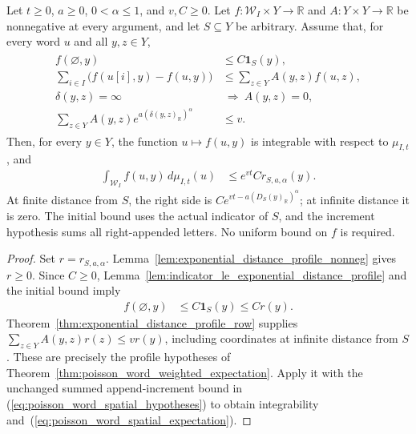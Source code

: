 \begin{theorem}
\label{thm:poisson_word_spatial_expectation}
\leanok
{}
Let $t\geq0$, $a\geq0$, $0<\alpha\leq1$, and $v,C\geq0$.
Let $f:\mathcal W_I\times Y\to\mathbb R$ and
$A:Y\times Y\to\mathbb R$ be nonnegative at every argument,
and let $S\subseteq Y$ be arbitrary.
Assume that, for every word $u$ and all $y,z\in Y$,
\begin{align}
 \begin{aligned}
 f(\varnothing,y)&\leq C\mathbf 1_S(y),\\
 \sum_{i\in I}\bigl(f(u[i],y)-f(u,y)\bigr)
 &\leq\sum_{z\in Y}A(y,z)f(u,z),\\
 \delta(y,z)=\infty&\ \Longrightarrow\ A(y,z)=0,\\
 \sum_{z\in Y}A(y,z)e^{a(\delta(y,z)_{\mathbb R})^\alpha}
 &\leq v.
 \end{aligned}
 \label{eq:poisson_word_spatial_hypotheses}
\end{align}
Then, for every $y\in Y$, the function $u\mapsto f(u,y)$ is
integrable with respect to $\mu_{I,t}$, and
\begin{align}
 \int_{\mathcal W_I}f(u,y)\,d\mu_{I,t}(u)
 &\leq e^{vt}C r_{S,a,\alpha}(y).
 \label{eq:poisson_word_spatial_expectation}
\end{align}
At finite distance from $S$, the right side is
$C e^{vt-a(D_S(y)_{\mathbb R})^\alpha}$; at infinite distance it is
zero.  The initial bound uses the actual indicator of $S$, and the
increment hypothesis sums all right-appended letters.  No uniform
bound on $f$ is required.
\end{theorem}
\begin{proof}
\leanok
{}
Set $r=r_{S,a,\alpha}$.
Lemma~\ref{lem:exponential_distance_profile_nonneg} gives $r\geq0$.
Since $C\geq0$, Lemma~\ref{lem:indicator_le_exponential_distance_profile}
and the initial bound imply
\begin{align}
 f(\varnothing,y)&\leq C\mathbf 1_S(y)\leq C r(y).
 \label{eq:poisson_word_spatial_initial_profile}
\end{align}
Theorem~\ref{thm:exponential_distance_profile_row} supplies
$\sum_{z\in Y}A(y,z)r(z)\leq v r(y)$, including coordinates at
infinite distance from $S$.
These are precisely the profile hypotheses of
Theorem~\ref{thm:poisson_word_weighted_expectation}.
Apply it with the unchanged summed append-increment bound in
(\ref{eq:poisson_word_spatial_hypotheses}) to obtain integrability
and~(\ref{eq:poisson_word_spatial_expectation}).
\end{proof}

